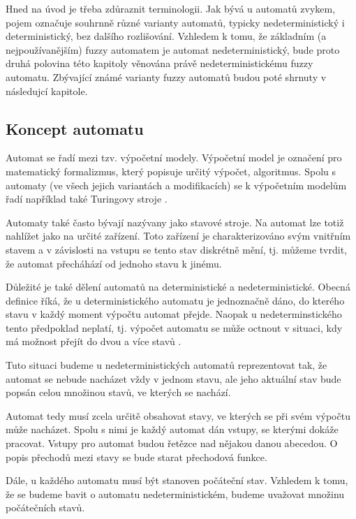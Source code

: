 \documentclass[a4paper,10pt]{article}
\begin{document}
Hned na úvod je třeba zdůraznit terminologii. Jak bývá u automatů zvykem, pojem  označuje souhrnně různé varianty automatů, typicky nedeterministický i deterministický, bez dalšího rozlišování. Vzhledem k tomu, že základním (a nejpoužívanějším) fuzzy automatem je automat nedeterministický, bude proto druhá polovina této kapitoly věnována právě nedeterministickému fuzzy automatu. Zbývající známé varianty fuzzy automatů budou poté shrnuty v následujcí kapitole.


\subsection{Koncept automatu}
Automat se řadí mezi tzv. výpočetní modely. Výpočetní model je označení pro matematický formalizmus, který popisuje určitý výpočet, algoritmus. Spolu s automaty (ve všech jejich variantách a modifikacích) se k výpočetním modelům řadí například také Turingovy stroje \cite{MorMal-FuzzyAutLang}. 

Automaty také často bývají nazývany jako stavové stroje. Na automat lze totiž nahlížet jako na určité zařízení. Toto zařízení je charakterizováno svým vnitřním stavem a v závislosti na vstupu se tento stav diskrétně mění, tj. můžeme tvrdit, že automat přecháhází od jednoho stavu k jinému.

Důležité je také dělení automatů na deterministické a nedeterministické. Obecná definice říká, že u deterministického automatu je jednoznačně dáno, do kterého stavu v každý moment výpočtu automat přejde. Naopak u nedeterminstického tento předpoklad neplatí, tj. výpočet automatu se může octnout v situaci, kdy má možnost přejít do dvou a více stavů .

Tuto situaci budeme u nedeterministických automatů reprezentovat tak, že automat se nebude nacházet vždy v jednom stavu, ale jeho aktuální stav bude popsán celou množinou stavů, ve kterých se nachází.

Automat tedy musí zcela určitě obsahovat stavy, ve kterých se při svém výpočtu může nacházet. Spolu s nimi je každý automat dán vstupy, se kterými dokáže pracovat. Vstupy pro automat budou řetězce nad nějakou danou abecedou. O popis přechodů mezi stavy se bude starat přechodová funkce.

Dále, u každého automatu musí být stanoven počáteční stav. Vzhledem k tomu, že se budeme bavit o automatu nedeterministickém, budeme uvažovat množinu počátečních stavů.
\end{document}
